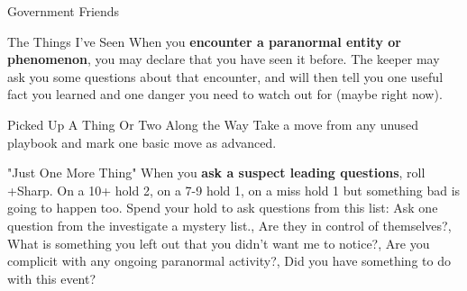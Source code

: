 {\begin{move}[]{Government Friends}
\end{move}%
\br[1mm]
%
\begin{move}{The Things I've Seen}
When you \textbf{encounter a paranormal entity or phenomenon}, you may declare that you have seen it before.  The keeper may ask you some questions about that encounter, and will then tell you one useful fact you learned and one danger you need to watch out for (maybe right now).
\end{move}%
\br[1mm]
%
\begin{move}{Picked Up A Thing Or Two Along the Way}
Take a move from any unused playbook and mark one basic move as advanced.
\end{move}%
\br[1mm]
%
\begin{move}{"Just One More Thing"}
When you \textbf{ask a suspect leading questions}, roll +Sharp. On a 10+ hold 2, on a 7-9 hold 1, on a miss hold 1 but something bad is going to happen too. Spend your hold to ask questions from this list:
\holdoptions%
{Ask one question from the investigate a mystery list.,
Are they in control of themselves?,
What is something you left out that you didn’t want me to notice?,
Are you complicit with any ongoing paranormal activity?,
Did you have something to do with this event?}
\end{move}
%
}\pagebreak%
%
